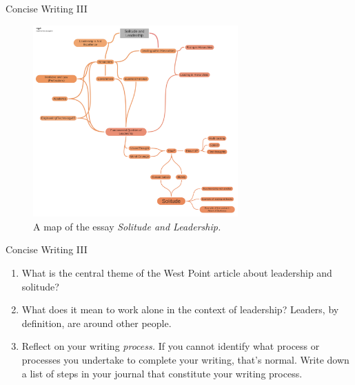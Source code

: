 \documentclass{beamer}
\begin{document}
\begin{frame}{Concise Writing III}
\begin{figure}
\includegraphics[width=0.7\textwidth]{figures/Solitude_and_Leadership.pdf}
\caption{\label{fig:leadership}  A map of the essay \textit{Solitude and Leadership.}}
\end{figure}
\end{frame}

\begin{frame}{Concise Writing III}
\begin{enumerate}
\item What is the central theme of the West Point article about leadership and solitude?
\item What does it mean to work alone in the context of leadership?  Leaders, by definition, are around other people.
\item Reflect on your writing \textit{process.}  If you cannot identify what process or processes you undertake to complete your writing, that's normal.  Write down a list of steps in your journal that constitute your writing process.
\end{enumerate}
\end{frame}
\end{document}
